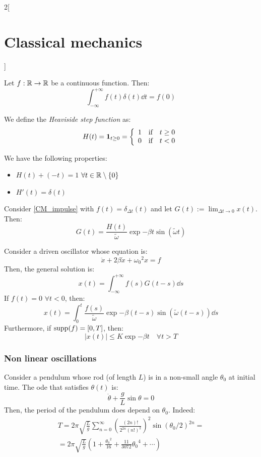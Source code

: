\documentclass[../../../main.tex]{subfiles}
\begin{document}
\begin{multicols}{2}[\section{Classical mechanics}]
\begin{proposition}
    Let $f:\mathbb{R}\rightarrow\mathbb{R}$ be a continuous function. Then: $$\int_{-\infty}^{+\infty}f(t)\delta(t)\dd{t}=f(0)$$
  \end{proposition}
  \begin{definition}
    We define the \emph{Heaviside step function} as: $$H(t)=\boldsymbol{\mathrm{1}}_{t\geq 0}=\left\{
      \begin{array}{ccc}
        1 & \text{if} & t\geq 0 \\
        0 & \text{if} & t<0
      \end{array}\right.
    $$
  \end{definition}
  \begin{proposition}
    We have the following properties:
    \begin{itemize}
      \item $H(t)+(-t)=1$ $\forall t\in\mathbb{R}\setminus\{0\}$
      \item $H'(t)=\delta(t)$
    \end{itemize}
  \end{proposition}
  \begin{proposition}
    Consider \cref{CM_impulse} with $f(t)=\delta_{\Delta t}(t)$ and let $\displaystyle G(t):=\lim_{\Delta t\to 0}x(t)$. Then: $$G(t)=\frac{H(t)}{\tilde{\omega}}\exp{-\beta t}\sin(\tilde{\omega}t)$$
  \end{proposition}
  \begin{theorem}
    Consider a driven oscillator whose equation is:
    \begin{equation*}
      \ddot{x}+2\beta\dot{x}+{\omega_0}^2x=f
    \end{equation*}
    Then, the general solution is: $$x(t)=\int_{-\infty}^{+\infty}f(s)G(t-s)\dd{s}$$
    If $f(t)=0$ $\forall t<0$, then:
    $$x(t)=\int_0^t\frac{f(s)}{\tilde{\omega}}\exp{-\beta (t-s)}\sin(\tilde{\omega}(t-s))\dd{s}$$
    Furthermore, if $\operatorname{supp} (f)=[0,T]$, then: $$|x(t)|\leq K\exp{-\beta t}\quad\forall t> T$$
  \end{theorem}
  \subsubsection{Non linear oscillations}
  \begin{definition}
    Consider a pendulum whose rod (of length $L$) is in a non-small angle $\theta_0$ at initial time. The ode that satisfies $\theta(t)$ is:
    $$\ddot{\theta}+\frac{g}{L}\sin\theta=0$$
    Then, the period of the pendulum does depend on $\theta_0$. Indeed:
    \begin{multline*}
      T=2\pi\sqrt{\frac{L}{g}}\sum_{n=0}^\infty{\left(\frac{(2n)!}{2^{2n}{(n!)}^2}\right)}^2{\sin(\theta_0/2)}^{2n}=\\=2\pi\sqrt{\frac{L}{g}}\left(1+\frac{{\theta_0}^2}{16}+\frac{11}{3072}{\theta_0}^4+\cdots\right)
    \end{multline*}
  \end{definition}

\end{multicols}
\end{document}
